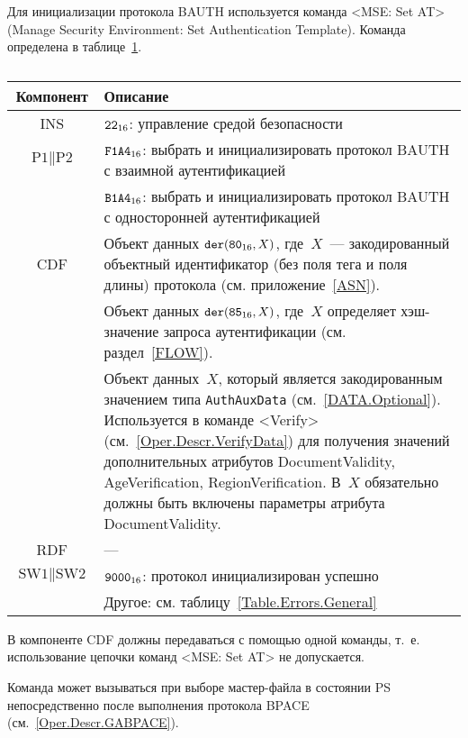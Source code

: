 Для инициализации протокола BAUTH используется команда <MSE: Set AT> 
(Manage Security Environment: Set Authentication Template).
Команда определена в таблице~\ref{Table.Oper.SetBAUTHCmd}.

\begin{table}[hbt]
\caption{}\label{Table.Oper.SetBAUTHCmd}
\begin{tabular}{|c|p{14cm}|}
\hline
Компонент & Описание \\
\hline
\hline
INS & $\texttt{22}_{16}$: управление средой безопасности\\ 
\hline
$\text{P1} \parallel\text{P2}$ & $\texttt{F1A4}_{16}$: выбрать и 
инициализировать протокол BAUTH с взаимной 
аутентификацией \\ 
\cline{2-2}
 & $\texttt{B1A4}_{16}$: выбрать и инициализировать протокол BAUTH с 
односторонней аутентификацией\\
\hline
CDF & Объект данных 
$\texttt{der}(\texttt{80}_{16}, X)$, где~$X$~--- 
закодированный объектный идентификатор (без поля тега и поля 
длины) протокола (см. приложение~\ref{ASN}).\\
 & Объект данных $\texttt{der}(\texttt{85}_{16}, X)$, 
где~$X$ определяет хэш-значение запроса аутентификации (см. раздел~\ref{FLOW}).\\
 & Объект данных~$X$, который является 
закодированным значением типа \verb|AuthAuxData| (см.~\ref{DATA.Optional}). 
Используется в команде <Verify> (см.~\ref{Oper.Descr.VerifyData}) 
для получения значений дополнительных атрибутов DocumentValidity, 
AgeVerification, RegionVerification. В~$X$ 
обязательно должны быть включены параметры атрибута DocumentValidity.\\
\hline 
\hline
RDF &  --- \\
\hline
$\text{SW1} \parallel \text{SW2}$ 
  & $\texttt{9000}_{16}$: протокол инициализирован успешно \\
\cline{2-2}
  & Другое: см. таблицу~\ref{Table.Errors.General}\\
\hline
\end{tabular}
\end{table}

В компоненте CDF  должны передаваться с помощью одной команды, т.~е. использование
цепочки команд <MSE: Set AT> не допускается.

Команда может вызываться при выборе мастер-файла в состоянии PS 
непосредственно после выполнения протокола BPACE 
(см.~\ref{Oper.Descr.GABPACE}). 
%

